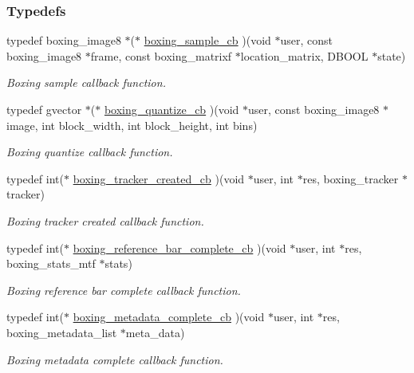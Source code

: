 \subsubsection*{Typedefs}
\begin{DoxyCompactItemize}
\item 
typedef boxing\_\-image8 $\ast$($\ast$ \hyperlink{group__unboxer_gad341bfd9895ae5c55c2697a388a898ce}{boxing\_\-sample\_\-cb} )(void $\ast$user, const boxing\_\-image8 $\ast$frame, const boxing\_\-matrixf $\ast$location\_\-matrix, DBOOL $\ast$state)
\begin{DoxyCompactList}\small\item\em Boxing sample callback function. \item\end{DoxyCompactList}\item 
typedef gvector $\ast$($\ast$ \hyperlink{group__unboxer_gac0f9cec0fc7b0ad34eaf5bad8b017cf9}{boxing\_\-quantize\_\-cb} )(void $\ast$user, const boxing\_\-image8 $\ast$image, int block\_\-width, int block\_\-height, int bins)
\begin{DoxyCompactList}\small\item\em Boxing quantize callback function. \item\end{DoxyCompactList}\item 
typedef int($\ast$ \hyperlink{group__unboxer_gabdf338be152e0494e1e3da7a73164c59}{boxing\_\-tracker\_\-created\_\-cb} )(void $\ast$user, int $\ast$res, boxing\_\-tracker $\ast$tracker)
\begin{DoxyCompactList}\small\item\em Boxing tracker created callback function. \item\end{DoxyCompactList}\item 
typedef int($\ast$ \hyperlink{group__unboxer_gae52c4aa9002423b4b7d1f15e2fe56f3f}{boxing\_\-reference\_\-bar\_\-complete\_\-cb} )(void $\ast$user, int $\ast$res, boxing\_\-stats\_\-mtf $\ast$stats)
\begin{DoxyCompactList}\small\item\em Boxing reference bar complete callback function. \item\end{DoxyCompactList}\item 
typedef int($\ast$ \hyperlink{group__unboxer_ga330e695e728124040d50ed2e615018f9}{boxing\_\-metadata\_\-complete\_\-cb} )(void $\ast$user, int $\ast$res, boxing\_\-metadata\_\-list $\ast$meta\_\-data)
\begin{DoxyCompactList}\small\item\em Boxing metadata complete callback function. \item\end{DoxyCompactList}\item 

\end{DoxyCompactItemize}
